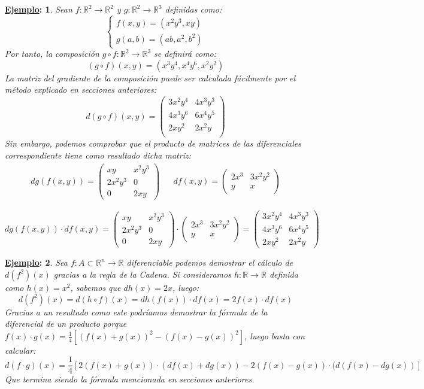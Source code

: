 \documentclass[10pt,a4paper,openright]{book}
\theoremstyle{break}
\newtheorem*{ej}{\underline{Ejemplo}:}
\begin{document}
\begin{ej}
Sean $f: \mathbb{R}^2 \to \mathbb{R}^2$ y $g: \mathbb{R}^2 \to \mathbb{R}^3$ definidas como:
$$\begin{cases} f(x,y) = (x^2 y^3, xy) \\ g(a,b) = (ab, a^2, b^2)\end{cases}$$
Por tanto, la composición $g \circ f: \mathbb{R}^2 \to \mathbb{R}^3$
se definirá como:
$$\left(g\circ f \right)(x,y) = (x^3y^4, x^4y^6,x^2y^2)$$
La matriz del gradiente de la composición puede ser calculada fácilmente por el método explicado en secciones anteriores:
$$d(g \circ f) (x,y) = \begin{pmatrix} 3x^2y^4 & 4x^3y^3  \\ 4x^3y^6 & 6x^4y^5  \\ 2xy^2 & 2x^2y \\\end{pmatrix}$$
Sin embargo, podemos comprobar que el producto de matrices de las diferenciales correspondiente tiene como resultado dicha matriz:
\begin{align*}
d g (f(x,y)) = \begin{pmatrix}
xy & x^2 y^3 \\ 2x^2y^3 & 0 \\ 0 & 2xy
\end{pmatrix} & &
df(x,y) = \begin{pmatrix}
2x^3 & 3x^2y^2 \\ y & x
\end{pmatrix}
\end{align*}

$$d g (f(x,y)) \cdot df(x,y) = \begin{pmatrix}
xy & x^2 y^3 \\ 2x^2y^3 & 0 \\ 0 & 2xy
\end{pmatrix} \cdot  \begin{pmatrix}
2x^3 & 3x^2y^2 \\ y & x
\end{pmatrix} = \begin{pmatrix}
3x^2y^4 & 4x^3y^3 \\ 4x^3y^6 & 6x^4y^5 \\ 2xy^2 & 2x^2y
\end{pmatrix}$$
\end{ej}

\begin{ej}
Sea $f: A \subset \mathbb{R}^n \to \mathbb{R}$ diferenciable podemos demostrar el cálculo de $d(f^2)(x)$ gracias a la regla de la Cadena.
Si consideramos $h: \mathbb{R} \to \mathbb{R}$ definida como $h(x)=x^2$, sabemos que $dh(x) = 2x$, luego:
$$d(f^2)(x) = d(h \circ f)(x) = d h(f(x)) \cdot df(x) = 2 f(x) \cdot df(x)$$
Gracias a un resultado como este podríamos demostrar la fórmula de la diferencial de un producto porque $f(x)\cdot g(x) = \frac{1}{4} [(f(x) + g(x))^2 - (f(x) - g(x))^2]$, luego basta con calcular:
$$d(f \cdot g) (x) = \frac{1}{4}\left[ 2 (f(x) + g(x)) \cdot (df(x) + dg(x)) - 2 (f(x) - g(x)) \cdot (d(f(x) - dg(x)) \right]$$
Que termina siendo la fórmula mencionada en secciones anteriores.
\end{ej}
\end{document}
